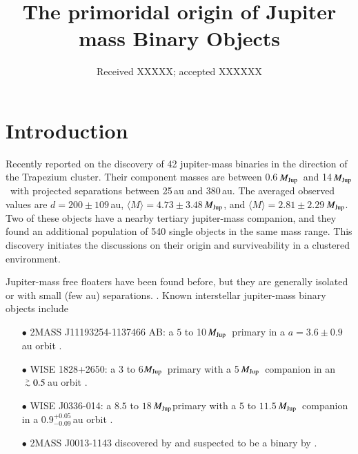 \documentclass[aa]{lib/aa}
\newcommand{\MJup}{\mbox{${M}_{\rm Jup}$}}
\def\apgt{\ {\raise-.5ex\hbox{$\buildrel>\over\sim$}}\ }
\begin{document}
 

   \title{The primoridal origin of Jupiter mass Binary Objects}
   \date{Received XXXXX; accepted XXXXXX}

  \abstract
   {}
   {}
   {}
   {}
   {}

   \maketitle
   
\section{Introduction}

Recently \cite{2023arXiv231001231P} reported on the discovery of 42
jupiter-mass binaries in the direction of the Trapezium cluster.
Their component masses are between 0.6\,\MJup\, and 14\,\MJup\, with
projected separations between 25\,au and 380\,au.  The averaged
observed values are $d=200\pm109$\,au, $\langle M\rangle =
4.73\pm3.48$\,\MJup, and $\langle M\rangle = 2.81\pm2.29$\,\MJup.
Two of these objects have a nearby tertiary jupiter-mass companion,
and they found an additional population of 540 single objects in the
same mass range. This discovery initiates the discussions on their
origin and surviveability in a clustered environment.

Jupiter-mass free floaters have been found before, but they are
generally isolated or with small (few au) separations.
\cite{2021ApJS..253....7K}.  Known interstellar jupiter-mass binary
objects include
\begin{itemize}
  \item[$\bullet$] 2MASS J11193254-1137466 AB: a $5$
to 10\,\MJup\, primary in a $a=3.6\pm0.9$\,au orbit \cite{2017ApJ...843L...4B}.
  \item[$\bullet$] WISE 1828+2650: a 3 to 6\MJup\, primary with a
    5\,\MJup\ companion in an $\apgt 0.5$\,au orbit
    \cite{2013ApJ...764..101B}.
  \item[$\bullet$] WISE J0336-014: a $8.5$ to $18$\,\MJup primary with
    a $5$ to $11.5$\,\MJup\, companion in a $0.9^{+0.05}_{-0.09}$\,au
    orbit \cite{2023ApJ...947L..30C}.
  \item[$\bullet$] 2MASS J0013-1143 discovered by
    \cite{2017AJ....154..112K} and suspected to be a binary by
    \cite{2019A&A...629A.145E}.
\end{itemize}
\end{document}
